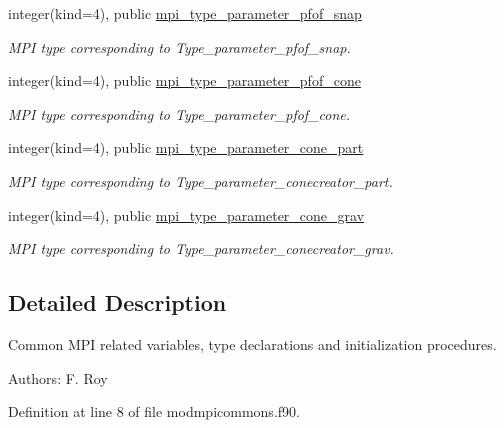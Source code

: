 \begin{DoxyCompactItemize}
integer(kind=4), public \hyperlink{classmodmpicommons_ab52ab5f47b5ef66ae14b8fb64521b798}{mpi\-\_\-type\-\_\-parameter\-\_\-pfof\-\_\-snap}
\begin{DoxyCompactList}\small\item\em M\-P\-I type corresponding to Type\-\_\-parameter\-\_\-pfof\-\_\-snap. \end{DoxyCompactList}\item 
integer(kind=4), public \hyperlink{classmodmpicommons_a218b0422727269c7f9cff7a8eb5b22bc}{mpi\-\_\-type\-\_\-parameter\-\_\-pfof\-\_\-cone}
\begin{DoxyCompactList}\small\item\em M\-P\-I type corresponding to Type\-\_\-parameter\-\_\-pfof\-\_\-cone. \end{DoxyCompactList}\item 
integer(kind=4), public \hyperlink{classmodmpicommons_a5ea3acdd1a05643c2a359ed42abd3264}{mpi\-\_\-type\-\_\-parameter\-\_\-cone\-\_\-part}
\begin{DoxyCompactList}\small\item\em M\-P\-I type corresponding to Type\-\_\-parameter\-\_\-conecreator\-\_\-part. \end{DoxyCompactList}\item 
integer(kind=4), public \hyperlink{classmodmpicommons_a9f948ab13dbfdd8f08dede33bd3deed1}{mpi\-\_\-type\-\_\-parameter\-\_\-cone\-\_\-grav}
\begin{DoxyCompactList}\small\item\em M\-P\-I type corresponding to Type\-\_\-parameter\-\_\-conecreator\-\_\-grav. \end{DoxyCompactList}\end{DoxyCompactItemize}


\subsection{Detailed Description}
Common M\-P\-I related variables, type declarations and initialization procedures. 

Authors\-: F. Roy 

Definition at line 8 of file modmpicommons.\-f90.




